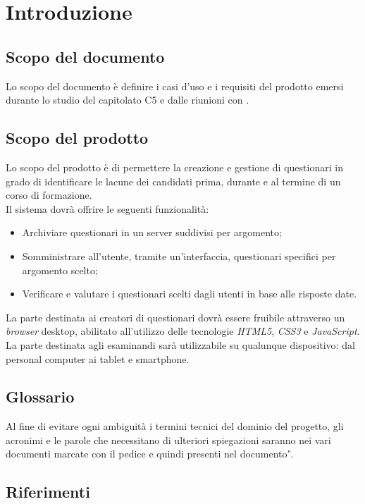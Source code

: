 \newpage
\section{Introduzione}

\subsection{Scopo del documento}
Lo scopo del documento è definire i casi d'uso e i requisiti del prodotto emersi durante lo studio del capitolato C5 e dalle riunioni con \ZU.
\subsection{Scopo del prodotto}
Lo scopo del prodotto è di permettere la creazione e gestione di questionari in grado di identificare le lacune dei candidati prima, durante e al termine di un corso di formazione. 
\\Il sistema dovrà offrire le seguenti funzionalità:
\begin{itemize}
\item
Archiviare questionari in un server suddivisi per argomento;
\item
Somministrare all'utente, tramite un'interfaccia, questionari specifici per argomento scelto;
\item
Verificare e valutare i questionari scelti dagli utenti in base alle risposte date.
\end{itemize}
La parte destinata ai creatori di questionari dovrà essere fruibile attraverso un \textit{browser} desktop, abilitato all'utilizzo delle tecnologie \textit{HTML5}, \textit{CSS3} e \textit{JavaScript}. La parte destinata agli esaminandi sarà utilizzabile su qualunque dispositivo: dal personal computer ai tablet e smartphone.

\subsection{Glossario}
Al fine di evitare ogni ambiguità i termini tecnici del dominio del progetto, gli acronimi e le parole che necessitano di ulteriori spiegazioni saranno nei vari documenti marcate con il pedice  e quindi presenti nel documento \textit{\G}.

\subsection{Riferimenti}

